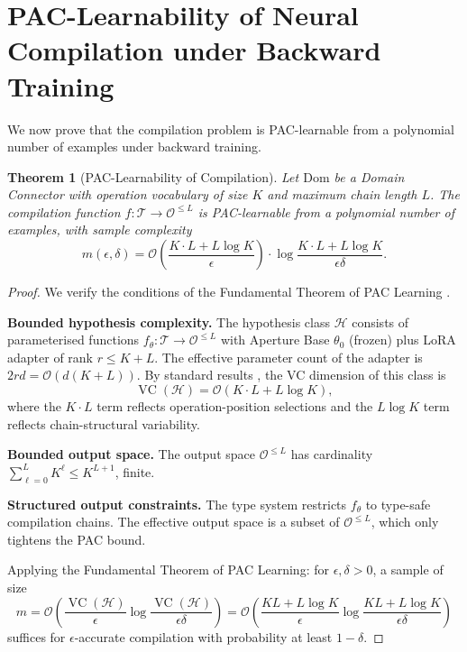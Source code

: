 \documentclass[twocolumn,11pt,a4paper]{article}
\newtheorem{theorem}{Theorem}[section]
\DeclareMathOperator{\VC}{VC}
\newcommand{\cT}{\mathcal{T}}
\newcommand{\cO}{\mathcal{O}}
\newcommand{\cH}{\mathcal{H}}
\begin{document}
\section{PAC-Learnability of Neural Compilation under Backward Training}
\label{sec:pac}

We now prove that the compilation problem is PAC-learnable from a polynomial number of examples under backward training.

\begin{theorem}[PAC-Learnability of Compilation]
\label{thm:pac-compilation}
Let $\mathrm{Dom}$ be a Domain Connector with operation vocabulary of size $K$ and maximum chain length $L$. The compilation function $f: \cT \to \cO^{\leq L}$ is PAC-learnable from a polynomial number of examples, with sample complexity
\begin{equation}
m(\epsilon, \delta) = \mathcal{O}\!\left(\frac{K \cdot L + L \log K}{\epsilon}\right) \cdot \log \frac{K \cdot L + L \log K}{\epsilon \delta}.
\end{equation}
\end{theorem}

\begin{proof}
We verify the conditions of the Fundamental Theorem of PAC Learning \citep{valiant1984theory,blumer1989learnability,shalev2014understanding}.

\textbf{Bounded hypothesis complexity.} The hypothesis class $\cH$ consists of parameterised functions $f_\theta: \cT \to \cO^{\leq L}$ with Aperture Base $\theta_0$ (frozen) plus LoRA adapter of rank $r \leq K + L$. The effective parameter count of the adapter is $2rd = \mathcal{O}(d(K + L))$. By standard results \citep{shalev2014understanding,mohri2018foundations}, the VC dimension of this class is
\begin{equation}
\VC(\cH) = \mathcal{O}(K \cdot L + L \log K),
\end{equation}
where the $K \cdot L$ term reflects operation-position selections and the $L \log K$ term reflects chain-structural variability.

\textbf{Bounded output space.} The output space $\cO^{\leq L}$ has cardinality $\sum_{\ell=0}^L K^\ell \leq K^{L+1}$, finite.

\textbf{Structured output constraints.} The type system restricts $f_\theta$ to type-safe compilation chains. The effective output space is a subset of $\cO^{\leq L}$, which only tightens the PAC bound.

Applying the Fundamental Theorem of PAC Learning: for $\epsilon, \delta > 0$, a sample of size
\begin{equation}
m = \mathcal{O}\!\left(\frac{\VC(\cH)}{\epsilon}\log\frac{\VC(\cH)}{\epsilon\delta}\right) = \mathcal{O}\!\left(\frac{K L + L \log K}{\epsilon}\log\frac{K L + L \log K}{\epsilon\delta}\right)
\end{equation}
suffices for $\epsilon$-accurate compilation with probability at least $1 - \delta$.
\end{proof}
\end{document}
